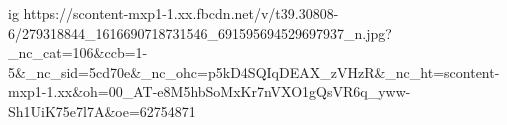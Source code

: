  
 
 
 
 

\ifcmt
  ig https://scontent-mxp1-1.xx.fbcdn.net/v/t39.30808-6/279318844_1616690718731546_691595694529697937_n.jpg?_nc_cat=106&ccb=1-5&_nc_sid=5cd70e&_nc_ohc=p5kD4SQIqDEAX_zVHzR&_nc_ht=scontent-mxp1-1.xx&oh=00_AT-e8M5hbSoMxKr7nVXO1gQsVR6q_yww-Sh1UiK75e7l7A&oe=62754871
\fi

